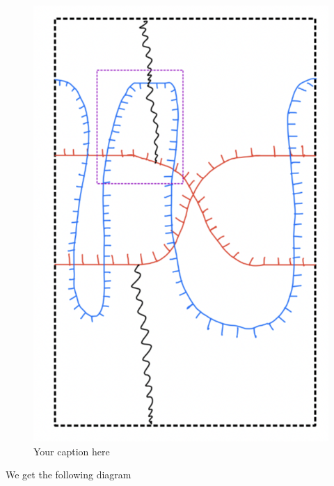 \begin{figure}[H] %
    \centering
    \includegraphics[scale = 0.95]{diagrams/lemma10/9.png} %
    \caption{Your caption here}
    \label{fig:your-label}
\end{figure}

We get the following diagram

